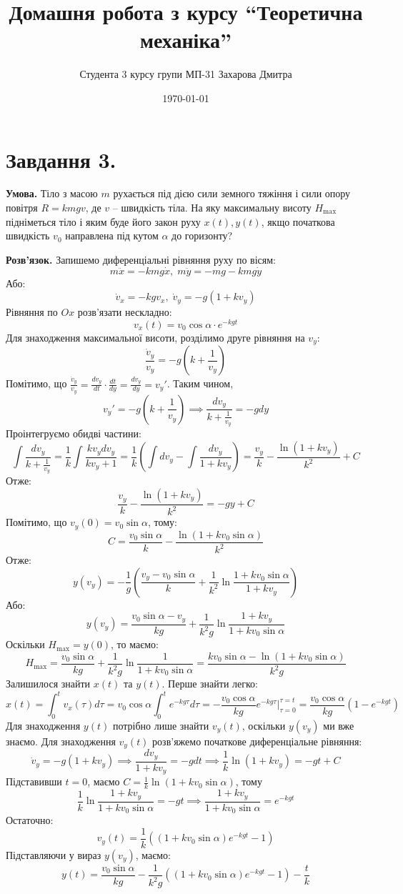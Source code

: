 \documentclass[12pt]{extarticle}
\title{Домашня робота з курсу ``Теоретична механіка''}
\author{Студента 3 курсу групи МП-31 Захарова Дмитра}
\date{\today}
\begin{document}
\maketitle

\section*{Завдання 3.}
\textbf{Умова.} Тіло з масою $m$ рухається під дією сили земного тяжіння і сили опору повітря $R = kmgv$, де $v$ -- швидкість тіла. На яку максимальну висоту $H_{\max}$ підніметься тіло і яким буде його закон руху $x(t),y(t)$, якщо початкова швидкість $v_0$ направлена під кутом $\alpha$ до горизонту?

\textbf{Розв'язок.} Запишемо диференціальні рівняння руху по вісям:
\[
m\ddot{x} = -kmg \dot{x}, \; m\ddot{y} = -mg - kmg\dot{y}
\]
Або:
\[
\dot{v}_x = -kgv_x, \; \dot{v}_y = -g(1+kv_y)
\]
Рівняння по $Ox$ розв'язати нескладно:
\[
v_x(t) = v_0 \cos\alpha \cdot e^{-kgt}
\]
Для знаходження максимальної висоти, розділимо друге рівняння на $v_y$:
\[
\frac{\dot{v}_y}{v_y} = -g\left(k + \frac{1}{v_y}\right)
\]
Помітимо, що $\frac{\dot{v}_y}{v_y} = \frac{dv_y}{dt} \cdot \frac{dt}{dy} = \frac{dv_y}{dy} = v_y'$. Таким чином,
\[
v_y' = -g\left(k+\frac{1}{v_y}\right) \implies \frac{dv_y}{k+\frac{1}{v_y}} = -gdy
\]
Проінтегруємо обидві частини:
\[
\int \frac{dv_y}{k+\frac{1}{v_y}} = \frac{1}{k}\int \frac{kv_ydv_y}{kv_y+1} = \frac{1}{k}\left(\int dv_y - \int\frac{dv_y}{1+kv_y}\right)= \frac{v_y}{k} - \frac{\ln(1+kv_y)}{k^2} + C
\]
Отже:
\[
\frac{v_y}{k} - \frac{\ln(1+kv_y)}{k^2} = -gy + C
\]
Помітимо, що $v_y(0) = v_0 \sin \alpha$, тому:
\[
C = \frac{v_0 \sin\alpha}{k} - \frac{\ln(1+kv_0\sin\alpha)}{k^2}
\]
Отже:
\[
y(v_y) = -\frac{1}{g}\left(\frac{v_y - v_0\sin\alpha}{k} + \frac{1}{k^2} \ln \frac{1+kv_0\sin\alpha}{1+kv_y}\right)
\]
Або:
\[
y(v_y) = \frac{v_0\sin\alpha - v_y}{kg} + \frac{1}{k^2g} \ln \frac{1+kv_y}{1+kv_0\sin\alpha}
\]
Оскільки $H_{\max} = y(0)$, то маємо:
\[
H_{\max} = \frac{v_0 \sin\alpha}{kg} + \frac{1}{k^2g} \ln \frac{1}{1+kv_0\sin\alpha} = \frac{kv_0\sin\alpha - \ln(1+kv_0\sin\alpha)}{k^2g}
\]
Залишилося знайти $x(t)$ та $y(t)$. Перше знайти легко:
\[
x(t) = \int_0^t v_x(\tau)d\tau = v_0\cos\alpha \int_0^{t} e^{-kg\tau}d\tau = -\frac{v_0\cos\alpha}{kg}e^{-kg\tau}\Big|_{\tau=0}^{\tau=t} = \frac{v_0\cos\alpha}{kg}(1-e^{-kgt})
\]
Для знаходження $y(t)$ потрібно лише знайти $v_y(t)$, оскільки $y(v_y)$ ми вже знаємо. Для знаходження $v_y(t)$ розв'яжемо початкове диференціальне рівняння:
\[
\dot{v}_y = -g(1+kv_y) \implies \frac{dv_y}{1+kv_y} = -gdt \implies \frac{1}{k}\ln (1+kv_y) = -gt + C
\]
Підставивши $t=0$, маємо $C=\frac{1}{k}\ln(1+kv_0\sin\alpha)$, тому
\[
\frac{1}{k}\ln \frac{1+kv_y}{1+kv_0\sin\alpha} = -gt \implies \frac{1+kv_y}{1+kv_0\sin\alpha} = e^{-kgt}
\]
Остаточно:
\[
v_y(t) = \frac{1}{k}\left((1+kv_0\sin\alpha)e^{-kgt}-1\right)
\]
Підставляючи у вираз $y(v_y)$, маємо:
\[
y(t) = \frac{v_0\sin\alpha}{kg} - \frac{1}{k^2g}\left((1+kv_0\sin\alpha)e^{-kgt}-1\right) - \frac{t}{k}
\]
\end{document}
